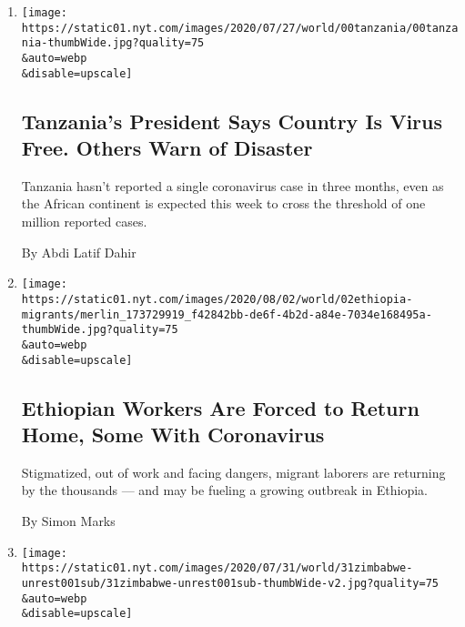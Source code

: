 \begin{enumerate}
\def\labelenumi{\arabic{enumi}.}
\item
  \href{/2020/08/04/world/africa/tanzanias-coronavirus-president.html}{}

  \texttt{[image: https://static01.nyt.com/images/2020/07/27/world/00tanzania/00tanzania-thumbWide.jpg?quality=75\\\&auto=webp\\\&disable=upscale]}

  \hypertarget{tanzanias-president-says-country-is-virus-free-others-warn-of-disaster}{%
  \subsection{Tanzania's President Says Country Is Virus Free. Others
  Warn of
  Disaster}\label{tanzanias-president-says-country-is-virus-free-others-warn-of-disaster}}

  Tanzania hasn't reported a single coronavirus case in three months,
  even as the African continent is expected this week to cross the
  threshold of one million reported cases.

  By Abdi Latif Dahir
\item
  \href{/2020/08/01/world/africa/ethiopian-migrant-workers-coronavirus.html}{}

  \texttt{[image: https://static01.nyt.com/images/2020/08/02/world/02ethiopia-migrants/merlin\_173729919\_f42842bb-de6f-4b2d-a84e-7034e168495a-thumbWide.jpg?quality=75\\\&auto=webp\\\&disable=upscale]}

  \hypertarget{ethiopian-workers-are-forced-to-return-home-some-with-coronavirus}{%
  \subsection{Ethiopian Workers Are Forced to Return Home, Some With
  Coronavirus}\label{ethiopian-workers-are-forced-to-return-home-some-with-coronavirus}}

  Stigmatized, out of work and facing dangers, migrant laborers are
  returning by the thousands --- and may be fueling a growing outbreak
  in Ethiopia.

  By Simon Marks
\item
  \href{/2020/07/31/world/africa/zimbabwe-coronavirus-protest.html}{}

  \texttt{[image: https://static01.nyt.com/images/2020/07/31/world/31zimbabwe-unrest001sub/31zimbabwe-unrest001sub-thumbWide-v2.jpg?quality=75\\\&auto=webp\\\&disable=upscale]}

  \hypertarget{zimbabwe-locks-down-capital-thwarting-planned-protests}{%
}
\end{enumerate}
